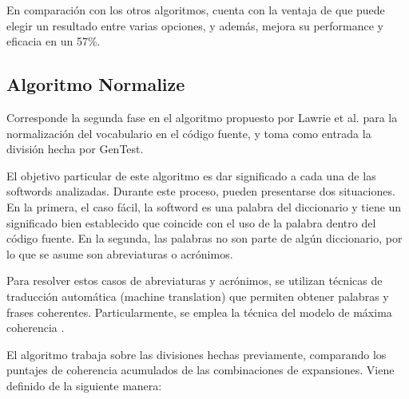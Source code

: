 {\begin{algorithm}

  \BlankLine
\end{algorithm}

En comparación con los otros algoritmos, cuenta con la ventaja de que puede elegir un resultado entre varias opciones, y además, mejora su performance y eficacia en un 57\%.

\subsection{Algoritmo Normalize}
Corresponde la segunda fase en el algoritmo propuesto por Lawrie et al. \cite{LawrieBinkleyMorrell2010} para la normalización del vocabulario en el código fuente, y toma como entrada la división hecha por GenTest.

El objetivo particular de este algoritmo es dar significado a cada una de las softwords analizadas.
Durante este proceso, pueden presentarse dos situaciones.
En la primera, el caso fácil, la softword es una palabra del diccionario y tiene un significado bien establecido que coincide con el uso de la palabra dentro del código fuente.
En la segunda, las palabras no son parte de algún diccionario, por lo que se asume son abreviaturas o acrónimos.

Para resolver estos casos de abreviaturas y acrónimos, se utilizan técnicas de traducción automática (machine translation) que permiten obtener palabras y frases coherentes.
Particularmente, se emplea la técnica del modelo de máxima coherencia \cite{LiuJinChai05}.

El algoritmo trabaja sobre las divisiones hechas previamente, comparando los puntajes de coherencia acumulados de las combinaciones de expansiones.
Viene definido de la siguiente manera:

}
